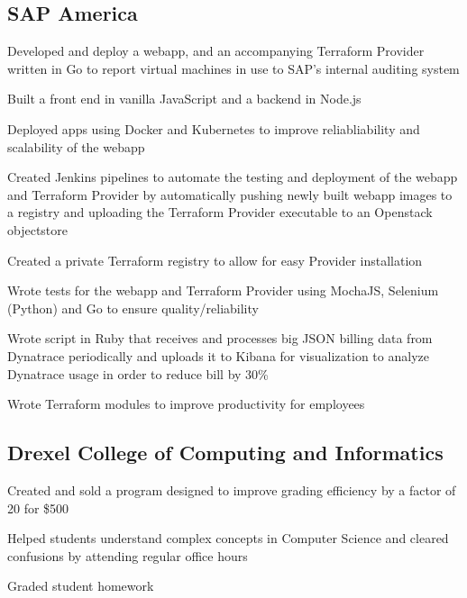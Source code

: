 \documentclass[]{deedy-resume-openfont}
\begin{document}
\begin{minipage}[t]{0.66\textwidth}
    \subsection{SAP America}
    \begin{tightemize}
        \item Developed and deploy a webapp, and an accompanying Terraform Provider written in Go to report virtual machines in use to SAP's internal auditing system
        \item Built a front end in vanilla JavaScript and a backend in Node.js
        \item Deployed apps using Docker and Kubernetes to improve reliabliability and scalability of the webapp
        \item Created Jenkins pipelines to automate the testing and deployment of the webapp and Terraform Provider by automatically pushing newly built webapp images to a registry and uploading the Terraform Provider executable to an Openstack objectstore
        \item Created a private Terraform registry to allow for easy Provider installation
        \item Wrote tests for the webapp and Terraform Provider using MochaJS, Selenium (Python) and Go to ensure quality/reliability
        \item Wrote script in Ruby that receives and processes big JSON billing data from Dynatrace periodically and  uploads it to Kibana for visualization to analyze Dynatrace usage in order to reduce bill by 30\%
        \item Wrote Terraform modules to improve productivity for employees \\
    \end{tightemize}
    \sectionsep
    
    
    \subsection{Drexel College of Computing and Informatics}
    \begin{tightemize}
        \item Created and sold a program designed to improve grading efficiency by a factor of 20 for \$500
        \item Helped students understand complex concepts in Computer Science and cleared confusions by attending regular office hours
        \item Graded student homework
    \end{tightemize}
    \sectionsep


\end{minipage}
\end{document}
